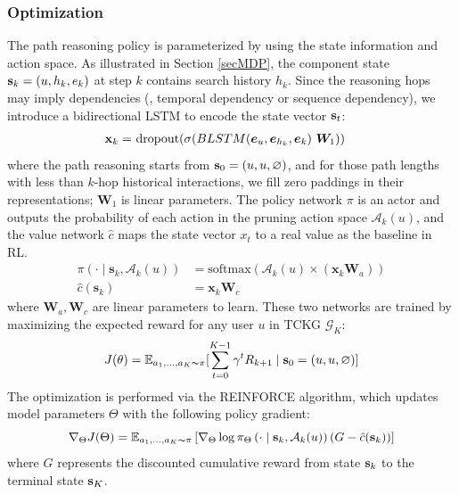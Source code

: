 \subsubsection{\textbf{Optimization}}
The path reasoning policy is parameterized by using the state information and action space. As illustrated in Section \ref{secMDP}, the component state $\textbf{s}_k = (u, h_k, e_k)$ at step $k$ contains search history $h_k$. Since the reasoning hops may imply dependencies (\eg, temporal dependency or sequence dependency), we introduce a bidirectional LSTM to encode the state vector $\textbf{s}_t$:
\begin{align}
 \textbf{x}_k = & \ \text{dropout}(\sigma(BLSTM(\boldsymbol{e}_u, \boldsymbol{e}_{h_k}, \boldsymbol{e}_k) \ \boldsymbol{W}_1))
\end{align}
where the path reasoning starts from $\textbf{s}_0 = (u, u, \varnothing)$, and for those path lengths with less than $k$-hop historical interactions, we fill zero paddings in their representations;
$\boldsymbol{W}_1$ is linear parameters.
The policy network $\pi$ is an actor and outputs the probability of each action in the pruning action space $\mathcal{A}_k(u)$, and the value network $\hat{c}$ maps the state vector $x_t$ to a real value as the baseline in RL. 
\begin{equation}
\begin{split}
	\pi\left(\cdot \mid \mathbf{s}_k, \mathcal{A}_{k}(u)\right) &=\text{softmax} \left(\mathcal{A}_{k}(u) \times \left(\mathbf{x}_k \boldsymbol{W}_{a}\right)\right) \\
	\hat{c}(\mathbf{s}_k) &=\mathbf{x}_k \boldsymbol{W}_{c}
	\end{split}
\end{equation}
where $\boldsymbol{W}_{a}, \boldsymbol{W}_{c}$ are linear parameters to learn.
These two networks are trained by maximizing the expected reward for any user $u$ in TCKG $\mathcal{G}_K$:
\begin{equation}
	J(\theta) = \mathbb{E}_{a_1, ...,a_K \thicksim 
	\pi}\lbrack\sum_{t=0}^{K-1}\gamma^t 
	R_{k+1} \mid \textbf{s}_0=(u,u,\varnothing)\rbrack
\end{equation}
The optimization is performed via the REINFORCE \cite{reinforcement} algorithm, which updates model parameters $\Theta$ with the following policy gradient: 
\begin{equation}
	\nabla_{\Theta} J(\Theta)=\mathbb{E}_{a_1, ...,a_K \thicksim 
		\pi}\left[\nabla_{\Theta} \log \pi_{\Theta}\left(\cdot \mid \textbf{s}_k, 
		\mathcal{A}_{k}(u)\right)(G-\hat{c}(\textbf{s}_k))\right]
\end{equation}
where $G$ represents the discounted cumulative reward from state $\textbf{s}_k$ to the terminal state $\textbf{s}_K$.


